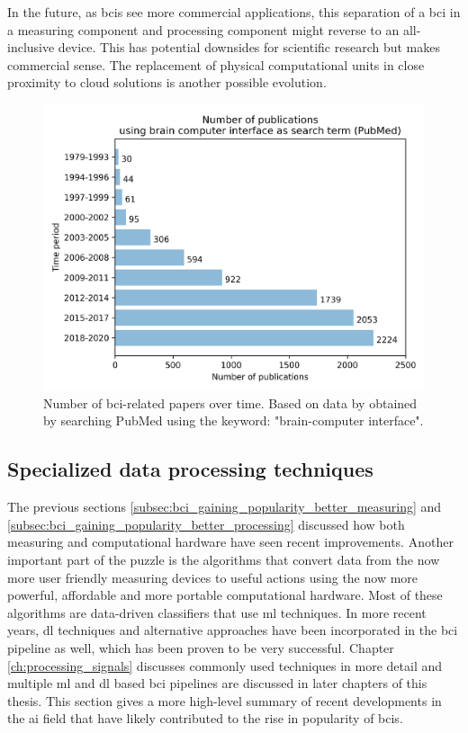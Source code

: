 In the future, as \glspl{bci} see more commercial applications, this separation of a \gls{bci} in a measuring component and processing component might reverse to an all-inclusive device.
This has potential downsides for scientific research but makes commercial sense.
The replacement of physical computational units in close proximity to cloud solutions is another possible evolution.

\begin{figure}[ht]
    \centering
    \includegraphics[width=0.7\linewidth]{../images/introduction/papers_on_bci.pdf}
    \captionsetup{width=0.65\linewidth}
    \captionsetup{justification=centering}
    \caption{Number of \gls{bci}-related papers over time. Based on data by \citet{bci_progress_overview} obtained by searching PubMed using the keyword: "brain-computer interface".}
    \label{fig:bci_publications}
\end{figure}



\subsection{Specialized data processing techniques}
\label{subsec:bci_gaining_popularity_improved_data_processing}


The previous sections \ref{subsec:bci_gaining_popularity_better_measuring} and \ref{subsec:bci_gaining_popularity_better_processing} discussed how both measuring and computational hardware have seen recent improvements.
Another important part of the puzzle is the algorithms that convert data from the now more user friendly measuring devices to useful actions using the now more powerful, affordable and more portable computational hardware.
Most of these algorithms are data-driven classifiers that use \gls{ml} techniques.
In more recent years, \gls{dl} techniques and alternative approaches have been incorporated in the \gls{bci} pipeline as well, which has been proven to be very successful. 
Chapter \ref{ch:processing_signals} discusses commonly used techniques in more detail and multiple \gls{ml} and \gls{dl} based \gls{bci} pipelines are discussed in later chapters of this thesis.
This section gives a more high-level summary of recent developments in the \gls{ai} field that have likely contributed to the rise in popularity of \glspl{bci}.

